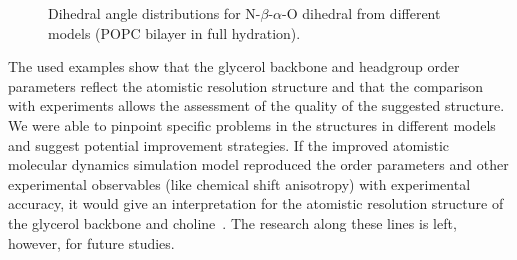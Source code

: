 \documentclass[pre,aps,floatfix,authordate1-4,twocolumn]{revtex4-1}
\begin{document}
\begin{figure}[]
  \centering
  \caption{\label{dihDISTS2}
    Dihedral angle distributions for N-$\beta$-$\alpha$-O dihedral from different models (POPC bilayer in full hydration).
  } 
\end{figure}

The used examples show that the glycerol backbone and headgroup order parameters reflect the atomistic resolution structure
and that the comparison with experiments allows the assessment of the quality of the suggested structure. We were able to pinpoint
specific problems in the structures in different models and suggest potential improvement strategies.
If the improved atomistic
molecular dynamics simulation model reproduced the order parameters and other experimental observables (like chemical shift anisotropy)
with experimental accuracy, it would give an interpretation for the atomistic resolution structure of the glycerol backbone and 
choline~\cite{seelig77b,skarjune79,jacobs80,davis83,akutsu91,hong95b,semchyschyn04}. The research along these lines is left, however,
for future studies.
\end{document}
